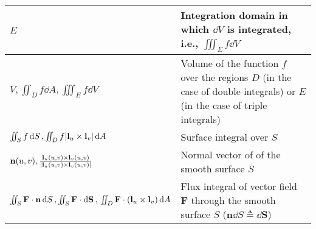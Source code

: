 \documentclass{article}
\begin{document}
\begin{xltabular}{\textwidth}{XX}
	\(E\)                                                                                                                                                                                                                                      & Integration domain in which \(\dd{V}\) is integrated, i.e., \(\iiint_E f \dd{V}\) \cite{stewartCalculus2011}                                                                                                                                            \\ \hline
	\(V, \iint_D f \dd{A}, \iiint_E f \dd{V}\)                                                                                                                                                                                                 & Volume of the function \(f\) over the regions \(D\) (in the case of double integrals) or \(E\) (in the case of triple integrals)                                                                                                                        \\ \hline
	\(\iint_S f \dd{S}, \iint_D f \abs{\mathbf{l}_u\times\mathbf{l}_v} \dd{A}\)                                                                                                                                                                & Surface integral over \(S\)                                                                                                                                                                                                                             \\ \hline
	\(\mathbf{n}(u,v), \frac{\mathbf{l}_u(u,v)\times\mathbf{l}_v(u,v)}{\abs{\mathbf{l}_u(u,v)\times\mathbf{l}_v(u,v)}}\)                                                                                                                       & Normal vector of of the smooth surface \(S\)                                                                                                                                                                                                            \\ \hline
	\(\iint_S \mathbf{F}\cdot \mathbf{n} \dd{S}, \iint_S \mathbf{F} \cdot \dd{\mathbf{S}}, \newline \iint_D \mathbf{F} \cdot (\mathbf{l}_u\times\mathbf{l}_v) \dd{A}\)                                                                         & Flux integral of vector field \(\mathbf{F}\) through the smooth surface \(S\) (\(\mathbf{n} \dd{S} \triangleq \dd{\mathbf{S}}\))                                                                                                                        \\ \hline

\end{xltabular}
\end{document}
